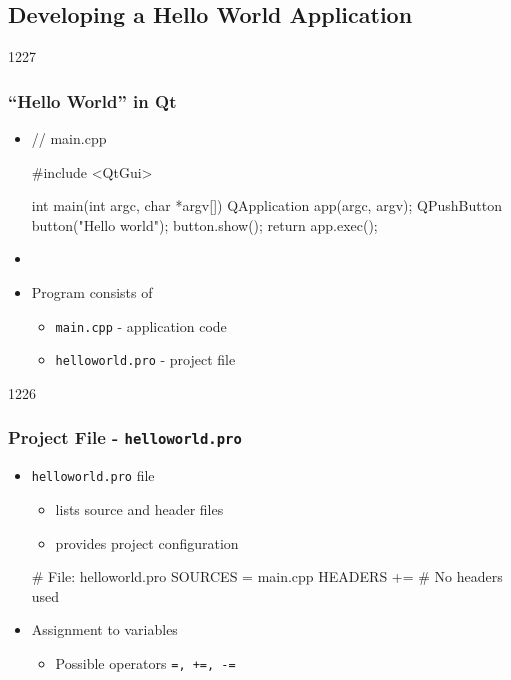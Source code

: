 \subsection{Developing a Hello World Application}

\begin{slide}[fragile]{1227}
  \frametitle{``Hello World'' in Qt}
  \medskip
  \begin{itemize}
  \item [] \begin{cpp}
// main.cpp

#include <QtGui>

int main(int argc, char *argv[])
{
  QApplication app(argc, argv);
  QPushButton button("Hello world");
  button.show();
  return app.exec();
}
  \end{cpp}
 \item[]
 \item Program consists of
    \begin{itemize}
    \item \texttt{main.cpp} - application code
    \item \texttt{helloworld.pro} - project file
    \end{itemize}
  \end{itemize}
\end{slide}

\begin{slide}[fragile]{1226}
\frametitle{Project File - \texttt{helloworld.pro}}
\begin{itemize}
\item \texttt{helloworld.pro} file
  \begin{itemize}
  \item lists source and header files
  \item provides project configuration
 \end{itemize}
\begin{qmake}
# File: helloworld.pro
SOURCES  = main.cpp
HEADERS +=          # No headers used
\end{qmake}
\item Assignment to variables
  \begin{itemize}
  \item Possible operators \texttt{=, +=, -=}
  \end{itemize}
\end{itemize}
\end{slide}

